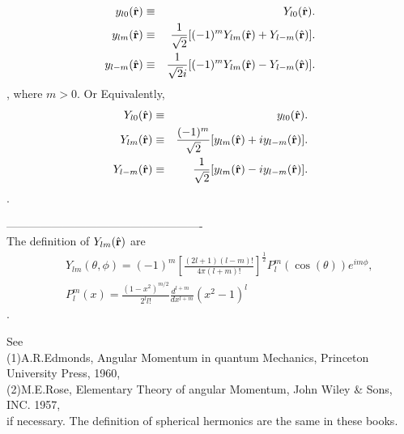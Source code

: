 \documentclass[a4paper,10pt,epsf,fleqn]{article}
\begin{document}
\begin{eqnarray}
 y_{l0}(\hat{\bf r}) 
  &\equiv& Y_{l0}(\hat{\bf r}). \\
 y_{lm}(\hat{\bf r}) 
  &\equiv& \frac{1}{\sqrt{2}}
           [ (-1)^m Y_{lm}(\hat{\bf r}) + Y_{l-m}(\hat{\bf r}) ]. \\
 y_{l-m}(\hat{\bf r})
  &\equiv& \frac{1}{\sqrt{2}i}
           [ (-1)^m Y_{lm}(\hat{\bf r}) - Y_{l-m}(\hat{\bf r}) ].
\end{eqnarray}
, where $m>0$. Or Equivalently,
\begin{eqnarray}
 Y_{l0}(\hat{\bf r}) 
  &\equiv& y_{l0}(\hat{\bf r}). \\
 Y_{lm}(\hat{\bf r}) 
  &\equiv& \frac{(-1)^m}{\sqrt{2}}
           [ y_{lm}(\hat{\bf r}) + iy_{l-m}(\hat{\bf r}) ]. \\
 Y_{l-m}(\hat{\bf r})
  &\equiv& \frac{1}{\sqrt{2}}
           [ y_{lm}(\hat{\bf r}) - iy_{l-m}(\hat{\bf r}) ].
\end{eqnarray}.

----------------------------------------------------\\
The definition of $Y_{lm}(\hat{\bf r})$ are
\begin{eqnarray}
&&Y_{lm}(\theta, \phi)
=(-1)^m \left[ \frac{(2l+1)(l-m)!}{4 \pi (l+m)!} \right]^{\frac{1}{2}} P^m_l(\cos(\theta)) e^{i m \phi}, \\
&&P^m_l(x) = \frac{(1-x^2)^{m/2}}{2^l l!}\frac{d^{l+m} \ \ }{dx^{l+m}} (x^2-1)^l
\end{eqnarray}.

\noindent See\\
(1)A.R.Edmonds, Angular Momentum in quantum Mechanics, 
Princeton University Press, 1960,\\
(2)M.E.Rose, Elementary Theory of angular Momentum,
John Wiley \& Sons, INC. 1957,\\
if necessary. The definition of spherical hermonics are the same in these books.


%





\newpage
\end{document}
